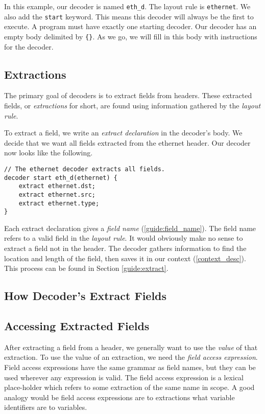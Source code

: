 In this example, our decoder is named \texttt{eth\_d}. The layout rule is \texttt{ethernet}. We also add the \texttt{start} keyword. This means this decoder will always be the first to execute. A program must have exactly one starting decoder. Our decoder has an empty body delimited by \texttt{\{\}}. As we go, we will fill in this body with instructions for the decoder.

\subsection{Extractions} \label{tut:decoder_extract}

The primary goal of decoders is to extract fields from headers. These extracted fields, or \textit{extractions} for short, are found using information gathered by the \textit{layout rule}.

To extract a field, we write an \textit{extract declaration} in the decoder's body. We decide that we want all fields extracted from the ethernet header. Our decoder now looks like the following.

\begin{codepage}
\begin{lstlisting}
// The ethernet decoder extracts all fields.
decoder start eth_d(ethernet) {
	extract ethernet.dst; 
	extract ethernet.src;
	extract ethernet.type; 
}
\end{lstlisting}
\end{codepage}

Each extract declaration gives a \textit{field name} (\ref{guide:field_name}). The field name refers to a valid field in the \textit{layout rule}. It would obviously make no sense to extract a field not in the header. The decoder gathers information to find the location and length of the field, then saves it in our context (\ref{context_desc}). This process can be found in Section \ref{guide:extract}.

\subsection{How Decoder's Extract Fields} \label{tut:extract_how}

\subsection{Accessing Extracted Fields} \label{tut:decoder_access}

After extracting a field from a header, we generally want to use the \textit{value} of that extraction. To use the value of an extraction, we need the \textit{field access expression}. Field access expressions have the same grammar as field names, but they can be used wherever any expression is valid. The field access expression is a lexical place-holder which refers to some extraction of the same name in scope. A good analogy would be field access expressions are to extractions what variable identifiers are to variables.

